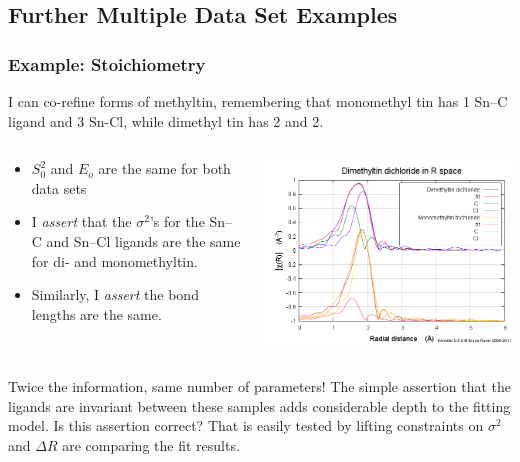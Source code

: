 \documentclass[10pt, xcolor=x11names, compress]{beamer}
\begin{document}
\subsection[Examples]{Further Multiple Data Set Examples}
\begin{frame}
  \frametitle{Example: Stoichiometry}

  I can co-refine {\color{Green4}forms of methyltin}, remembering that
  monomethyl tin has 1 Sn--C ligand and 3 Sn-Cl, while dimethyl tin
  has 2 and 2.
  \begin{columns}
    \begin{column}{0.55\linewidth}
      \begin{itemize}
      \item $S_0^2$ and $E_o$ are the same for both data sets
      \item I \textit{assert} that the $\sigma^2$'s for the Sn--C and
        Sn--Cl ligands are the same for di- and monomethyltin.
      \item Similarly, I \textit{assert} the bond lengths are the
        same.
      \end{itemize}
    \end{column}
    \begin{column}{0.45\linewidth}
      \includegraphics[width=\linewidth]{mds/methyltin.png}
    \end{column}
  \end{columns}
  \begin{exampleblock}{Twice the information, same number of parameters!}
    The simple assertion that the ligands are invariant between these
    samples adds considerable depth to the fitting model.  Is this
    assertion correct?  That is easily tested by lifting constraints
    on $\sigma^2$ and $\Delta R$ are comparing the fit results.
  \end{exampleblock}
\end{frame}
\end{document}

